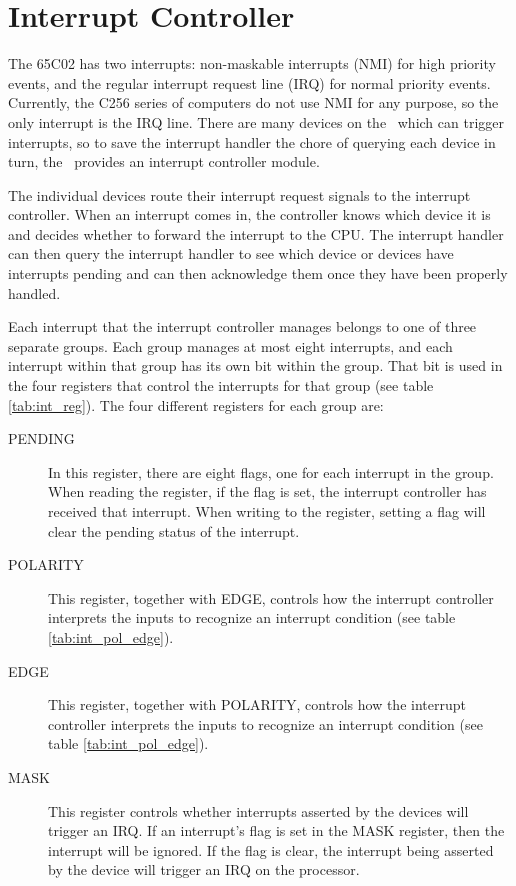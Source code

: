 \chapter{Interrupt Controller}
\label{chap:interrupts}

The 65C02 has two interrupts: non-maskable interrupts (NMI) for high priority events, and the regular interrupt request line (IRQ) for normal priority events. Currently, the C256 series of computers do not use NMI for any purpose, so the only interrupt is the IRQ line. There are many devices on the \jr\ which can trigger interrupts, so to save the interrupt handler the chore of querying each device in turn, the \jr\ provides an interrupt controller module.

The individual devices route their interrupt request signals to the interrupt controller. When an interrupt comes in, the controller knows which device it is and decides whether to forward the interrupt to the CPU. The interrupt handler can then query the interrupt handler to see which device or devices have interrupts pending and can then acknowledge them once they have been properly handled.

Each interrupt that the interrupt controller manages belongs to one of three separate groups. Each group manages at most eight interrupts, and each interrupt within that group has its own bit within the group. That bit is used in the four registers that control the interrupts for that group (see table \ref{tab:int_reg}). The four different registers for each group are:

\begin{description}
    \item[PENDING] In this register, there are eight flags, one for each interrupt in the group. When reading the register, if the flag is set, the interrupt controller has received that interrupt. When writing to the register, setting a flag will clear the pending status of the interrupt.
    \item[POLARITY] This register, together with EDGE, controls how the interrupt controller interprets the inputs to recognize an interrupt condition (see table \ref{tab:int_pol_edge}).
    \item[EDGE] This register, together with POLARITY, controls how the interrupt controller interprets the inputs to recognize an interrupt condition (see table \ref{tab:int_pol_edge}).
    \item[MASK] This register controls whether interrupts asserted by the devices will trigger an IRQ. If an interrupt's flag is set in the MASK register, then the interrupt will be ignored. If the flag is clear, the interrupt being asserted by the device will trigger an IRQ on the processor.
\end{description}


